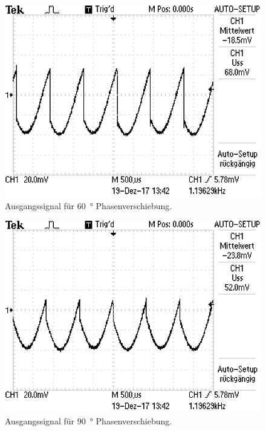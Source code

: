 \begin{figure}[H]
  \centering
  \includegraphics{content/images/60Phase.png}
  \caption{Ausgangssignal für \SI{60}{\degree} Phasenverschiebung.}
  \label{pic:6p}
\end{figure}
\begin{figure}[H]
  \centering
  \includegraphics{content/images/90Phase.png}
  \caption{Ausgangssignal für \SI{90}{\degree} Phasenverschiebung.}
  \label{pic:9p}
\end{figure}
